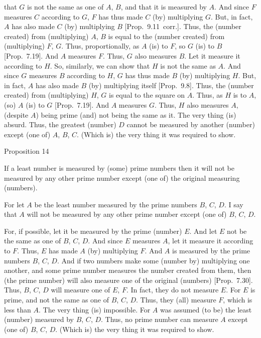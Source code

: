that $G$ is not the same as one of $A$, $B$, and that it is measured by $A$. 
And since $F$ measures $C$ according to $G$, $F$ has thus made
$C$ (by) multiplying $G$.  But, in fact, $A$ has
also made $C$ (by) multiplying $B$ [Prop.~9.11~corr.]. Thus, the (number created) from (multiplying)
$A$, $B$ is equal to  the (number created) from (multiplying) $F$, $G$.
Thus, proportionally, as $A$ (is) to $F$, so $G$ (is) to $B$ [Prop.~7.19]. And $A$ measures $F$. 
Thus, $G$ also measures $B$.
Let it measure
it according to $H$. So, similarly, we can show that $H$ is not the same as $A$. And since $G$ measures $B$ according to $H$, $G$ has thus made $B$
(by) multiplying $H$.  But, in fact, $A$ has
 also made $B$ (by) multiplying itself [Prop.~9.8]. Thus, the (number created) from (multiplying)
$H$, $G$ is equal to  the square on $A$. Thus, as $H$ is to $A$, (so) $A$ (is) to $G$ [Prop.~7.19]. And $A$ measures $G$.
Thus, $H$ also measures $A$, (despite $A$) being prime (and) not being  the same as it. The very thing (is) absurd. Thus, the greatest (number) $D$ cannot be
measured by  another (number) except (one of) $A$, $B$, $C$. (Which is) the
very thing it was required to show.


\begin{center}
{\large Proposition 14}
\end{center}

If  a least number is measured by (some) prime numbers then it will not be measured by
any other prime number except (one of) the original measuring (numbers).

\epsfysize=0.9in
\centerline{}

For let $A$ be the least number measured by the prime numbers $B$, $C$, $D$. I say that $A$ will not be measured by any other prime number except
(one of) $B$, $C$, $D$.

For, if possible, let it be measured by the prime (number) $E$. And
let $E$ not be the same as one of $B$, $C$, $D$. And since $E$ measures
$A$, let it measure it according to $F$.  Thus, $E$ has made $A$ (by)
multiplying $F$. And $A$ is measured by the prime numbers $B$, $C$, $D$.
And if two numbers make some (number by) multiplying one another,
and some prime number  measures the number created from them, then (the prime number)
will also measure one of the original (numbers) [Prop.~7.30]. Thus, $B$, $C$, $D$ will measure one of
$E$, $F$. In fact, they do not measure $E$. For $E$ is prime, and not the
same as one of $B$, $C$, $D$. Thus, they (all) measure $F$, which is less than $A$. The very thing (is) impossible. For $A$ was assumed
(to be) the least (number) measured by $B$, $C$, $D$. Thus, no prime number can measure $A$ except (one of) $B$, $C$, $D$. (Which is) the very thing it was required to show.

